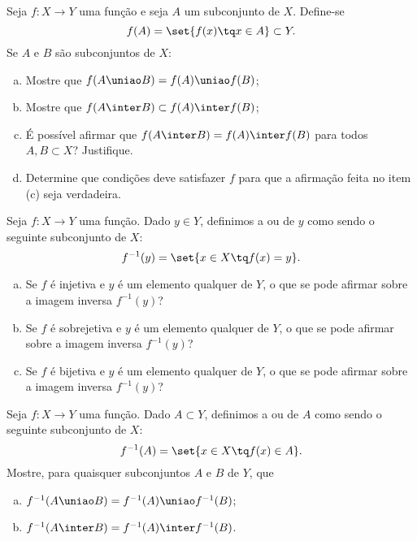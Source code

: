 \begin{exercise}
    Seja $f: X \to Y$ uma função e seja $A$ um subconjunto de $X$.
Define-se $$f(A) = \set{f(x) \tq x\in A} \subset Y.$$ Se $A$ e $B$
são subconjuntos de $X$:
\begin{enumerate}[(a)]
  \item Mostre que $f(A \uniao B) = f(A) \uniao f(B)$;
  \item Mostre que $f(A \inter B) \subset f(A) \inter f(B)$;
  \item É possível afirmar que $f(A \inter B) = f(A) \inter f(B)$ para
  todos $A, B \subset X$? Justifique.
  \item Determine que condições deve satisfazer $f$ para que a
  afirmação feita no item (c) seja verdadeira.
\end{enumerate}

\end{exercise}

\begin{exercise}
    Seja $f: X \to Y$ uma função. Dado $y \in Y$, definimos a
 ou  de $y$ como sendo o
seguinte subconjunto de $X$: $$ f^{-1}(y) = \set{x \in X \tq
f(x)=y}.$$
\begin{enumerate}[(a)]
  \item Se $f$ é injetiva e $y$ é um elemento qualquer de $Y$, o que
  se pode afirmar sobre a imagem inversa $f^{-1}(y)$?
  \item Se $f$ é sobrejetiva e $y$ é um elemento qualquer de $Y$, o que
  se pode afirmar sobre a imagem inversa $f^{-1}(y)$?
  \item Se $f$ é bijetiva e $y$ é um elemento qualquer de $Y$, o que
  se pode afirmar sobre a imagem inversa $f^{-1}(y)$?
\end{enumerate}
\end{exercise}

\begin{exercise}
    Seja $f: X \to Y$ uma função. Dado $A \subset Y$, definimos a
 ou  de $A$ como sendo o
seguinte subconjunto de $X$: $$ f^{-1}(A) = \set{x \in X \tq f(x)\in
A}.$$ Mostre, para quaisquer subconjuntos $A$ e $B$ de $Y$, que
\begin{enumerate}[(a)]
  \item $f^{-1} (A \uniao B) = f^{-1} (A) \uniao f^{-1} (B)$;
  \item $f^{-1} (A \inter B) = f^{-1} (A) \inter f^{-1} (B)$.
\end{enumerate}
\end{exercise}


